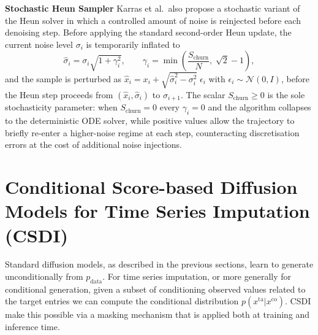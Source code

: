 \textbf{Stochastic Heun Sampler} \label{sec:stochastic_heun} \quad Karras et al.\ also propose a stochastic variant of the Heun solver in which a controlled amount of noise is reinjected before each denoising step. Before applying the standard second-order Heun update, the current noise level $\sigma_i$ is temporarily inflated to
\begin{equation}
    \label{eq:stochastic_heun}
    \hat{\sigma}_i = \sigma_i\sqrt{1 + \gamma_i^2}, \qquad
    \gamma_i = \min\!\left(\frac{S_{\text{churn}}}{N},\;\sqrt{2}-1\right),
\end{equation}
and the sample is perturbed as $\hat{x}_i = x_i + \sqrt{\hat{\sigma}_i^2 - \sigma_i^2}\;\epsilon_i$ with $\epsilon_i \sim \mathcal{N}(0,I)$, before the Heun step proceeds from $(\hat{x}_i,\hat{\sigma}_i)$ to $\sigma_{i+1}$. The scalar $S_{\text{churn}} \geq 0$ is the sole stochasticity parameter: when $S_{\text{churn}} = 0$ every $\gamma_i = 0$ and the algorithm collapses to the deterministic ODE solver, while positive values allow the trajectory to briefly re-enter a higher-noise regime at each step, counteracting discretisation errors at the cost of additional noise injections.

\section{Conditional Score-based Diffusion Models for Time Series Imputation (CSDI)}
\label{sec:csdi_literature}

Standard diffusion models, as described in the previous sections, learn to 
generate unconditionally from $p_{\text{data}}$. For time series imputation, or more generally for conditional generation, given a subset of conditioning observed values related to the target entries we can compute the conditional distribution $p(x^{\text{ta}} | x^{\text{co}})$. CSDI \cite{tashiro2021csdi} make this possible via a masking mechanism that is applied both at training and inference time. 

